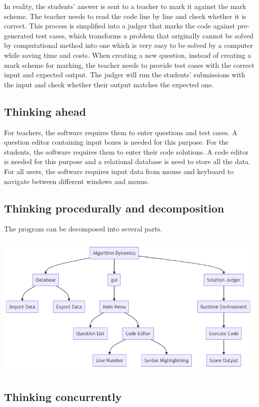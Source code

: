 \documentclass[a4paper]{report}
\begin{document}
In reality, the students' answer is sent to a teacher to mark it against the mark scheme. The teacher needs to read the code line by line and check whether it is correct. This process is simplified into a judger that marks the code against pre-generated test cases, which transforms a problem that originally cannot be solved by computational method into one which is very easy to be solved by a computer while saving time and costs. When creating a new question, instead of creating a mark scheme for marking, the teacher needs to provide test cases with the correct input and expected output. The judger will run the students' submissions with the input and check whether their output matches the expected one.

\subsection{Thinking ahead}

For teachers, the software requires them to enter questions and test cases. A question editor containing input boxes is needed for this purpose. For the students, the software requires them to enter their code solutions. A code editor is needed for this purpose and a relational database is need to store all the data. For all users, the software requires input data from mouse and keyboard to navigate between different windows and menus. 

\subsection{Thinking procedurally and decomposition}

The program can be decomposed into several parts.

\includegraphics[width=\linewidth]{decomposition}

\subsection{Thinking concurrently}
\end{document}
